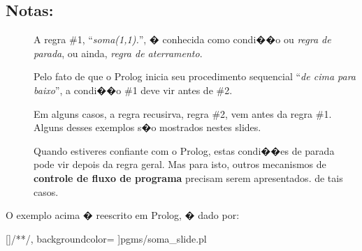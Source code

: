 \documentclass[final,a4paper]{article}
\begin{document}
\newpage
\subsection{Notas:}
\begin{description}

\item [] A regra \#1, ``\emph{soma(1,1).}'', � conhecida como condi��o ou
\emph{regra de parada}, ou ainda, \emph{regra de aterramento}.

\item [] Pelo fato de que o Prolog inicia seu procedimento sequencial ``\emph{de cima para baixo}'', a condi��o \#1 deve vir antes de \#2. 

\item [] Em alguns casos, a regra recusirva, regra \#2, vem antes da regra \#1. Alguns desses exemplos s�o mostrados nestes slides.

\item [] Quando estiveres confiante com o Prolog, estas condi��es de parada
pode vir depois da regra geral. Mas para isto, outros mecanismos de {\bf controle
de fluxo de programa} precisam serem apresentados.
de tais casos. 

\end{description}

\newpage

O exemplo acima � reescrito em Prolog, � dado por:

[\color{blue}]{/*}{*/}, %
           backgroundcolor=\color{yellow}  %
		 ]{pgms/soma_slide.pl}
\end{document}
